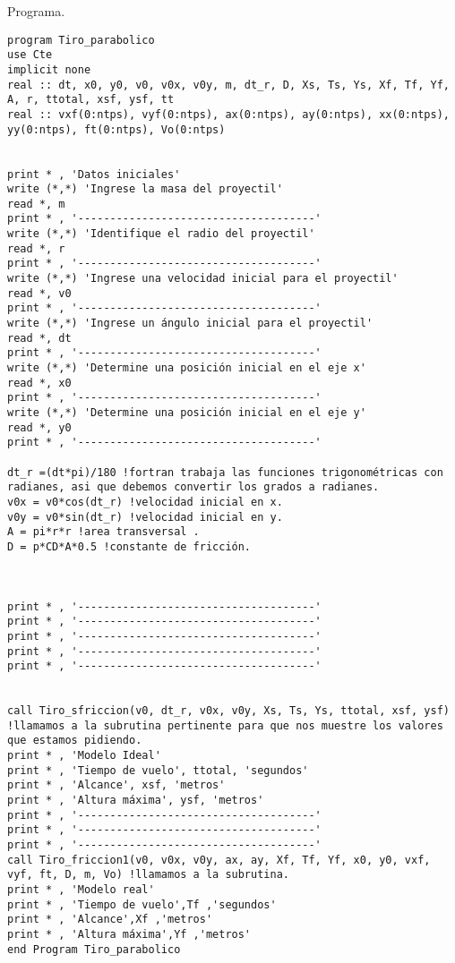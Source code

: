\documentclass[12pt]{article}
\begin{document}
\begin{large}
Programa.
\end{large}
\begin{verbatim}
program Tiro_parabolico
use Cte
implicit none 
real :: dt, x0, y0, v0, v0x, v0y, m, dt_r, D, Xs, Ts, Ys, Xf, Tf, Yf, A, r, ttotal, xsf, ysf, tt
real :: vxf(0:ntps), vyf(0:ntps), ax(0:ntps), ay(0:ntps), xx(0:ntps), yy(0:ntps), ft(0:ntps), Vo(0:ntps)


print * , 'Datos iniciales'
write (*,*) 'Ingrese la masa del proyectil'
read *, m
print * , '-------------------------------------'
write (*,*) 'Identifique el radio del proyectil'
read *, r
print * , '-------------------------------------'
write (*,*) 'Ingrese una velocidad inicial para el proyectil'
read *, v0
print * , '-------------------------------------'
write (*,*) 'Ingrese un ángulo inicial para el proyectil'
read *, dt
print * , '-------------------------------------'
write (*,*) 'Determine una posición inicial en el eje x'
read *, x0
print * , '-------------------------------------'
write (*,*) 'Determine una posición inicial en el eje y'
read *, y0
print * , '-------------------------------------'

dt_r =(dt*pi)/180 !fortran trabaja las funciones trigonométricas con radianes, asi que debemos convertir los grados a radianes. 
v0x = v0*cos(dt_r) !velocidad inicial en x.
v0y = v0*sin(dt_r) !velocidad inicial en y.
A = pi*r*r !area transversal .
D = p*CD*A*0.5 !constante de fricción.

 

print * , '-------------------------------------'
print * , '-------------------------------------'
print * , '-------------------------------------'
print * , '-------------------------------------'
print * , '-------------------------------------'


call Tiro_sfriccion(v0, dt_r, v0x, v0y, Xs, Ts, Ys, ttotal, xsf, ysf) !llamamos a la subrutina pertinente para que nos muestre los valores que estamos pidiendo.
print * , 'Modelo Ideal'
print * , 'Tiempo de vuelo', ttotal, 'segundos'
print * , 'Alcance', xsf, 'metros'
print * , 'Altura máxima', ysf, 'metros'
print * , '-------------------------------------'
print * , '-------------------------------------'
print * , '-------------------------------------'
call Tiro_friccion1(v0, v0x, v0y, ax, ay, Xf, Tf, Yf, x0, y0, vxf, vyf, ft, D, m, Vo) !llamamos a la subrutina.
print * , 'Modelo real'
print * , 'Tiempo de vuelo',Tf ,'segundos'
print * , 'Alcance',Xf ,'metros'
print * , 'Altura máxima',Yf ,'metros'
end Program Tiro_parabolico

\end{verbatim}
\end{document}
